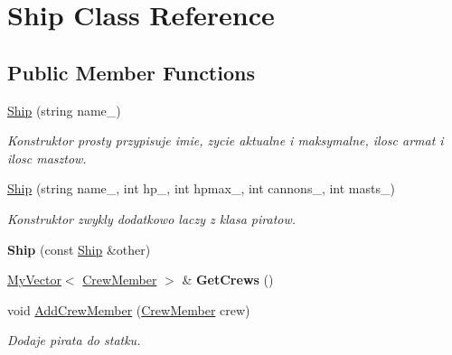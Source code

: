 \hypertarget{class_ship}{}\section{Ship Class Reference}
\label{class_ship}
\subsection*{Public Member Functions}
\begin{DoxyCompactItemize}
\item 
\mbox{\label{class_ship_a53f9329606690e48ed1ff3543fa4ae3e}} 
\hyperlink{class_ship_a53f9329606690e48ed1ff3543fa4ae3e}{Ship} (string name\+\_\+)
\begin{DoxyCompactList}\small\item\em Konstruktor prosty przypisuje imie, zycie aktualne i maksymalne, ilosc armat i ilosc masztow. \end{DoxyCompactList}\item 
\mbox{\label{class_ship_abb6276e9a6bfab2e74a2a74eda0fa705}} 
\hyperlink{class_ship_abb6276e9a6bfab2e74a2a74eda0fa705}{Ship} (string name\+\_\+, int hp\+\_\+, int hpmax\+\_\+, int cannons\+\_\+, int masts\+\_\+)
\begin{DoxyCompactList}\small\item\em Konstruktor zwykly dodatkowo laczy z klasa piratow. \end{DoxyCompactList}\item 
\mbox{\label{class_ship_a340e2a42d7a6449514154dac2c4c8750}} 
{\bfseries Ship} (const \hyperlink{class_ship}{Ship} \&other)
\item 
\mbox{\label{class_ship_a2e898baf9c4999fd2a2b14802aabc893}} 
\hyperlink{class_my_vector}{My\+Vector}$<$ \hyperlink{class_crew_member}{Crew\+Member} $>$ \& {\bfseries Get\+Crews} ()
\item 
\mbox{\label{class_ship_a8e6cb2f38ab78b23ad63c8805829fe4a}} 
void \hyperlink{class_ship_a8e6cb2f38ab78b23ad63c8805829fe4a}{Add\+Crew\+Member} (\hyperlink{class_crew_member}{Crew\+Member} crew)
\begin{DoxyCompactList}\small\item\em Dodaje pirata do statku. \end{DoxyCompactList}\item 

\end{DoxyCompactItemize}
